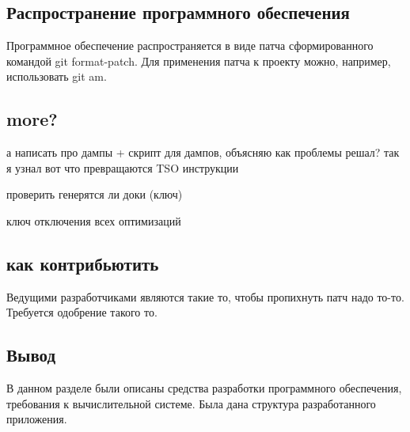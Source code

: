 \subsection{Распространение программного обеспечения}

Программное обеспечение распространяется в виде патча сформированного командой git format-patch. Для применения патча к проекту можно, например, использовать git am.

\subsection{more?}

а написать про дампы + скрипт для дампов, объясняю как проблемы решал?
так я узнал вот что превращаются TSO инструкции

проверить генерятся ли доки (ключ)

ключ отключения всех оптимизаций

\subsection{как контрибьютить}

Ведущими разработчиками являются такие то, чтобы пропихнуть патч надо то-то. Требуется одобрение такого то.

\subsection{Вывод}

В данном разделе были описаны средства разработки программного
обеспечения, требования к вычислительной системе. Была дана структура
разработанного приложения.

\pagebreak